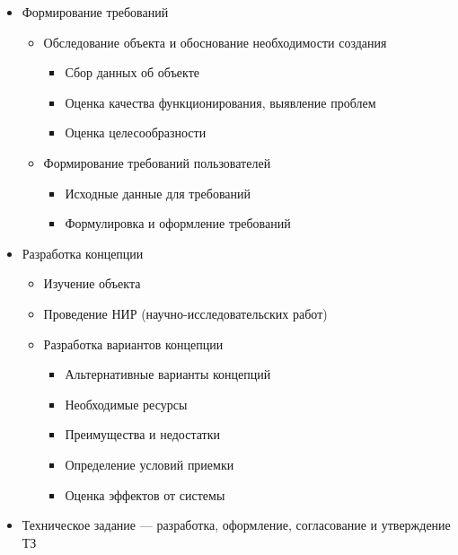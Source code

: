 \documentclass[12pt]{article}
\begin{document}
\begin{sloppypar}
    \begin{itemize}
        \item Формирование требований
              \begin{itemize}
                  \item Обследование объекта и обоснование необходимости создания
                        \begin{itemize}
                            \item Сбор данных об объекте
                            \item Оценка качества функционирования, выявление проблем
                            \item Оценка целесообразности
                        \end{itemize}
                  \item Формирование требований пользователей
                        \begin{itemize}
                            \item Исходные данные для требований
                            \item Формулировка и оформление требований
                        \end{itemize}
              \end{itemize}
        \item Разработка концепции
              \begin{itemize}
                  \item Изучение объекта
                  \item Проведение НИР (научно-исследовательских работ)
                  \item Разработка вариантов концепции
                        \begin{itemize}
                            \item Альтернативные варианты концепций
                            \item Необходимые ресурсы
                            \item Преимущества и недостатки
                            \item Определение условий приемки
                            \item Оценка эффектов от системы
                        \end{itemize}
              \end{itemize}
        \item Техническое задание — разработка, оформление, согласование и утверждение ТЗ

\end{itemize}
\end{sloppypar}
\end{document}
